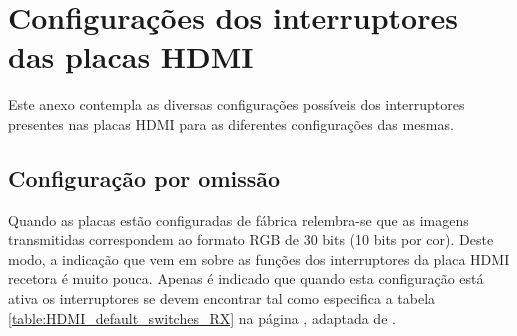 {\tiny \chapter{Configurações dos interruptores das placas HDMI} \label{ap4:switches}}

Este anexo contempla as diversas configurações possíveis dos interruptores presentes nas placas HDMI para as diferentes configurações das mesmas.

\section{Configuração por omissão} \label{sec:HDMIconfigdefault_switches}

Quando as placas estão configuradas de fábrica relembra-se que as imagens transmitidas correspondem ao formato RGB de 30 bits (10 bits por cor). Deste modo, a indicação que vem em \cite{R009} sobre as funções dos interruptores da placa HDMI recetora é muito pouca. Apenas é indicado que quando esta configuração está ativa os interruptores se devem encontrar tal como especifica a tabela \ref{table:HDMI_default_switches_RX} na página \pageref{table:HDMI_default_switches_RX}, adaptada de \cite{R009}.



